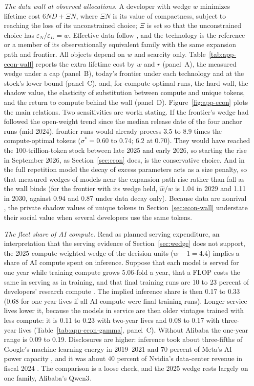 \textit{The data wall at observed allocations.} A developer with wedge $w$ minimizes lifetime cost $6ND+\Xi N$, where
$\Xi N$ is its value of compactness, subject to reaching the loss of its unconstrained choice; $\Xi$ is set so that the
unconstrained choice has $\varepsilon_N/\varepsilon_D=w$. Effective data follow \citet{muennighoff2023scaling}, and
the technology is the reference or a member of its observationally equivalent family with the same expansion path and
frontier. All objects depend on $w$ and scarcity only. Table~\ref{tab:app-econ-wall} reports the extra lifetime cost by
$w$ and $r$ (panel~A), the measured wedge under a cap (panel~B), today's frontier under each technology and at the stock's
lower bound (panel~C), and, for compute-optimal runs, the hard wall, the shadow value, the elasticity of substitution
between compute and unique tokens, and the return to compute behind the wall (panel~D). Figure~\ref{fig:app-econ} plots
the main relations. Two sensitivities are worth stating. If the frontier's wedge had followed the open-weight trend since
the median release date of the four anchor runs (mid-2024), frontier runs would already process 3.5 to 8.9 times the
compute-optimal tokens ($\sigma^*=0.60$ to 0.74; 6.2 at 0.70). They would have reached the 100-trillion-token stock
between late 2025 and early 2026, so starting the rise in September 2026, as Section~\ref{sec:econ} does, is the
conservative choice. And in the full repetition model the decay of excess parameters acts as a size penalty, so that
measured wedges of models near the expansion path rise rather than fall as the wall binds (for the frontier with its
wedge held, $\hat w/w$ is 1.04 in 2029 and 1.11 in 2030, against 0.94 and 0.87 under data decay only). Because data are
nonrival \citep{jones2020nonrivalry}, the private shadow values of unique tokens in Section~\ref{sec:econ-wall}
understate their social value when several developers use the same tokens.

\textit{The fleet share of AI compute.} Read as planned serving expenditure, an interpretation that the serving evidence
of Section~\ref{sec:wedge} does not support, the 2025 compute-weighted wedge of the decision units ($w-1=4.4$) implies a
share of AI compute spent on inference. Suppose that each model is served for one year while training compute grows
5.06-fold a year, that a FLOP costs the same in serving as in training, and that final training runs are 10 to 23
percent of developers' research compute \citep{denain2026final}. The implied inference share is then 0.17 to 0.33 (0.68
for one-year lives if all AI compute were final training runs). Longer service lives lower it, because the models in
service are then older vintages trained with less compute: it is 0.11 to 0.23 with two-year lives and 0.08 to 0.17 with
three-year lives (Table~\ref{tab:app-econ-gamma}, panel~C). Without Alibaba the one-year range is 0.09 to 0.19. Disclosures are higher: inference took about
three-fifths of Google's machine-learning energy in 2019--2021 \citep{patterson2022carbon} and 70 percent of Meta's AI
power capacity \citep{wu2022sustainable}, and it was about 40 percent of Nvidia's data-center revenue in fiscal 2024
\citep{nvidia2024q4call}. The comparison is a loose check, and the 2025 wedge rests largely on one family, Alibaba's
Qwen3.

